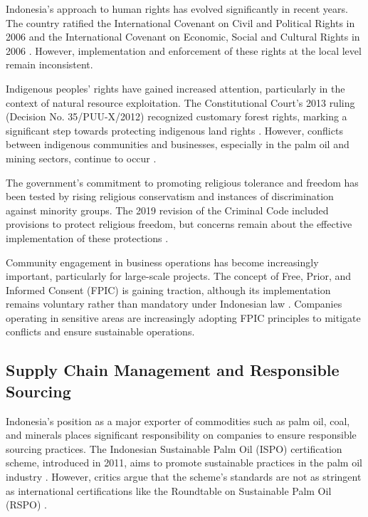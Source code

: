Indonesia's approach to human rights has evolved significantly in recent years. The country ratified the International Covenant on Civil and Political Rights in 2006 and the International Covenant on Economic, Social and Cultural Rights in 2006 \cite{OHCHR2023}. However, implementation and enforcement of these rights at the local level remain inconsistent.

Indigenous peoples' rights have gained increased attention, particularly in the context of natural resource exploitation. The Constitutional Court's 2013 ruling (Decision No. 35/PUU-X/2012) recognized customary forest rights, marking a significant step towards protecting indigenous land rights \cite{ConstitutionalCourt2013}. However, conflicts between indigenous communities and businesses, especially in the palm oil and mining sectors, continue to occur \cite{AmnestyInternational2022}.

The government's commitment to promoting religious tolerance and freedom has been tested by rising religious conservatism and instances of discrimination against minority groups. The 2019 revision of the Criminal Code included provisions to protect religious freedom, but concerns remain about the effective implementation of these protections \cite{HumanRightsWatch2020}.

Community engagement in business operations has become increasingly important, particularly for large-scale projects. The concept of Free, Prior, and Informed Consent (FPIC) is gaining traction, although its implementation remains voluntary rather than mandatory under Indonesian law \cite{ForestPeopleProgramme2021}. Companies operating in sensitive areas are increasingly adopting FPIC principles to mitigate conflicts and ensure sustainable operations.

\subsection{Supply Chain Management and Responsible Sourcing}

Indonesia's position as a major exporter of commodities such as palm oil, coal, and minerals places significant responsibility on companies to ensure responsible sourcing practices. The Indonesian Sustainable Palm Oil (ISPO) certification scheme, introduced in 2011, aims to promote sustainable practices in the palm oil industry \cite{ISPO2023}. However, critics argue that the scheme's standards are not as stringent as international certifications like the Roundtable on Sustainable Palm Oil (RSPO) \cite{ChainReactionResearch2022}.

